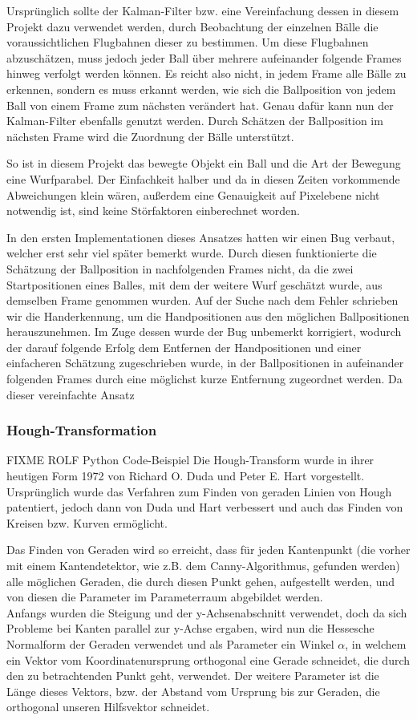 \documentclass[12pt,a4paper,ngerman]{scrartcl}
\begin{document}
Ursprünglich sollte der Kalman-Filter bzw. eine Vereinfachung dessen in diesem Projekt dazu verwendet werden, durch Beobachtung der einzelnen Bälle die voraussichtlichen Flugbahnen dieser zu bestimmen. Um diese Flugbahnen abzuschätzen, muss jedoch jeder Ball über mehrere aufeinander folgende Frames hinweg verfolgt werden können. Es reicht also nicht, in jedem Frame alle Bälle zu erkennen, sondern es muss erkannt werden, wie sich die Ballposition von jedem Ball von einem Frame zum nächsten verändert hat. Genau dafür kann nun der Kalman-Filter ebenfalls genutzt werden. Durch Schätzen der Ballposition im nächsten Frame wird die Zuordnung der Bälle unterstützt.

So ist in diesem Projekt das bewegte Objekt ein Ball und die Art der Bewegung eine Wurfparabel. Der Einfachkeit halber und da in diesen Zeiten vorkommende Abweichungen klein wären, außerdem eine Genauigkeit auf Pixelebene nicht notwendig ist, sind keine Störfaktoren einberechnet worden.

In den ersten Implementationen dieses Ansatzes hatten wir einen Bug verbaut, welcher erst sehr viel später bemerkt wurde. Durch diesen funktionierte die Schätzung der Ballposition in nachfolgenden Frames nicht, da die zwei Startpositionen eines Balles, mit dem der weitere Wurf geschätzt wurde, aus demselben Frame genommen wurden. Auf der Suche nach dem Fehler schrieben wir die Handerkennung, um die Handpositionen aus den möglichen Ballpositionen herauszunehmen. Im Zuge dessen wurde der Bug unbemerkt korrigiert, wodurch der darauf folgende Erfolg dem Entfernen der Handpositionen und einer einfacheren Schätzung zugeschrieben wurde, in der Ballpositionen in aufeinander folgenden Frames durch eine möglichst kurze Entfernung zugeordnet werden. Da dieser vereinfachte Ansatz 

\subsubsection{Hough-Transformation}
\label{sec:hough}
{\color{red} FIXME ROLF Python Code-Beispiel}
Die Hough-Transform wurde in ihrer heutigen Form 1972 von Richard O. Duda und Peter E. Hart\cite{hough} vorgestellt.\\
Ursprünglich wurde das Verfahren zum Finden von geraden Linien von Hough patentiert, jedoch dann von Duda und Hart verbessert und auch das Finden von Kreisen bzw. Kurven ermöglicht.

Das Finden von Geraden wird so erreicht, dass für jeden Kantenpunkt (die vorher mit einem Kantendetektor, wie z.B. dem Canny-Algorithmus, gefunden werden) alle möglichen Geraden, die durch diesen Punkt gehen, aufgestellt werden, und von diesen die Parameter im Parameterraum abgebildet werden.\\
Anfangs wurden die Steigung und der y-Achsenabschnitt verwendet, doch da sich Probleme bei Kanten parallel zur y-Achse ergaben, wird nun die Hessesche Normalform der Geraden verwendet und als Parameter ein Winkel $\alpha$, in welchem ein Vektor vom Koordinatenursprung orthogonal eine Gerade schneidet, die durch den zu betrachtenden Punkt geht, verwendet. Der weitere Parameter ist die Länge dieses Vektors, bzw. der Abstand vom Ursprung bis zur Geraden, die orthogonal unseren Hilfsvektor schneidet.
\end{document}
